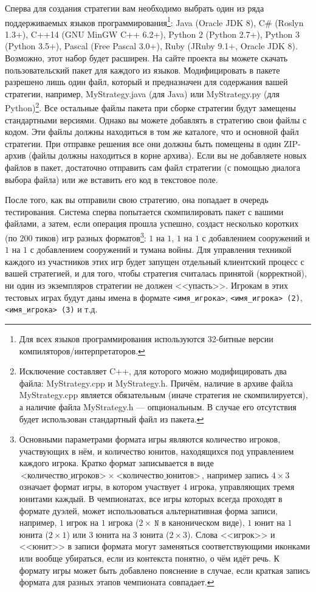 Сперва для создания стратегии вам необходимо выбрать один из ряда поддерживаемых языков программирования\footnote[4]{Для всех языков
программирования используются 32-битные версии компиляторов/интерпретаторов.}: Java (Oracle JDK 8), C\# (Roslyn 1.3+), C++14 (GNU MinGW C++
6.2+), Python 2 (Python 2.7+), Python 3 (Python 3.5+), Pascal (Free Pascal 3.0+), Ruby (JRuby 9.1+, Oracle JDK 8). Возможно, этот набор
будет расширен. На сайте проекта вы можете скачать пользовательский пакет для каждого из языков. Модифицировать в пакете разрешено лишь один
файл, который и предназначен для содержания вашей стратегии, например, MyStrategy.java (для Java) или MyStrategy.py (для
Python)\footnote[5]{Исключение составляет C++, для которого можно модифицировать два файла: MyStrategy.cpp и MyStrategy.h. Причём, наличие
в архиве файла MyStrategy.cpp является обязательным (иначе стратегия не скомпилируется), а наличие файла MyStrategy.h --- опциональным. В
случае его отсутствия будет использован стандартный файл из пакета.}. Все остальные файлы пакета при сборке стратегии будут замещены
стандартными версиями. Однако вы можете добавлять в стратегию свои файлы с кодом. Эти файлы должны находиться в том же каталоге, что и
основной файл стратегии. При отправке решения все они должны быть помещены в один ZIP-архив (файлы должны находиться в корне архива). Если
вы не добавляете новых файлов в пакет, достаточно отправить сам файл стратегии (с помощью диалога выбора файла) или же вставить его код в
текстовое поле.

После того, как вы отправили свою стратегию, она попадает в очередь тестирования. Система сперва попытается скомпилировать пакет с вашими
файлами, а затем, если операция прошла успешно, создаст несколько коротких (по $200$ тиков) игр разных форматов\footnote[6]{Основными
параметрами формата игры являются количество игроков, участвующих в нём, и количество юнитов, находящихся под управлением каждого игрока.
Кратко формат записывается в виде $\texttt{<количество\_игроков>}~\times~\texttt{<количество\_юнитов>}$, например запись $4\times3$ означает
формат игры, в котором участвует $4$ игрока, управляющих тремя юнитами каждый. В чемпионатах, все игры которых всегда проходят в формате
дуэлей, может использоваться альтернативная форма записи, например, $1$ игрок на $1$ игрока ($2\times~\texttt{N}$ в каноническом виде), $1$
юнит на $1$ юнита ($2\times1$) или $3$ юнита на $3$ юнита ($2\times3$). Слова <<игрок>> и <<юнит>> в записи формата могут заменяться
соответствующими иконками или вообще убираться, если из контекста понятно, о чём идёт речь. К формату игры может быть добавлено пояснение в
случае, если краткая запись формата для разных этапов чемпионата совпадает.}: $1$ на $1$, $1$ на $1$ с добавлением сооружений и $1$ на $1$ с
добавлением сооружений и тумана войны. Для управления техникой каждого из участников этих игр будет запущен отдельный клиентский процесс с
вашей стратегией, и для того, чтобы стратегия считалась принятой (корректной), ни один из экземпляров стратегии не должен <<упасть>>.
Игрокам в этих тестовых играх будут даны имена в формате \texttt{<имя\_игрока>}, \texttt{<имя\_игрока> (2)}, \texttt{<имя\_игрока> (3)} и
т.д.

